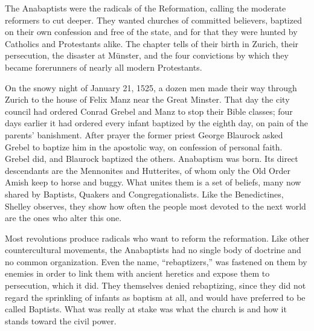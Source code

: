 
\begin{inbrief}
The Anabaptists were the radicals of the Reformation, calling the moderate reformers to cut deeper.
They wanted churches of committed believers, baptized on their own confession and free of the state,
and for that they were hunted by Catholics and Protestants alike. The chapter tells of their birth in
Zurich, their persecution, the disaster at M\"unster, and the four convictions by which they became
forerunners of nearly all modern Protestants.
\end{inbrief}

On the snowy night of January 21, 1525, a dozen men made their way through Zurich to the house of
Felix Manz near the Great Minster. That day the city council had ordered Conrad Grebel and Manz to
stop their Bible classes; four days earlier it had ordered every infant baptized by the eighth day, on pain of the parents' banishment. After prayer the former priest George Blaurock asked Grebel to
baptize him in the apostolic way, on confession of personal faith. Grebel did, and Blaurock baptized
the others. Anabaptism was born. Its direct descendants are the Mennonites and Hutterites, of whom
only the Old Order Amish keep to horse and buggy. What unites them is a set of beliefs, many now
shared by Baptists, Quakers and Congregationalists. Like the Benedictines, Shelley observes, they show
how often the people most devoted to the next world are the ones who alter this one.

Most revolutions produce radicals who want to reform the reformation. Like other countercultural
movements, the Anabaptists had no single body of doctrine and no common organization. Even the name,
``rebaptizers,'' was fastened on them by enemies in order to link them with ancient heretics and
expose them to persecution, which it did. They themselves denied rebaptizing, since they did not
regard the sprinkling of infants as baptism at all, and would have preferred to be called Baptists.
What was really at stake was what the church is and how it stands toward the civil power.

